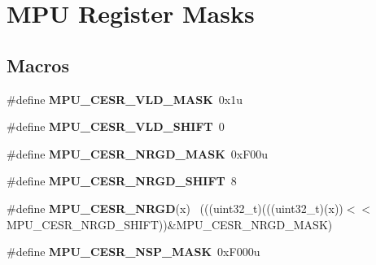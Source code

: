 \hypertarget{group___m_p_u___register___masks}{}\section{M\+P\+U Register Masks}
\label{group___m_p_u___register___masks}
\subsection*{Macros}
\begin{DoxyCompactItemize}
\item 
\hypertarget{group___m_p_u___register___masks_ga97170048bb44b005879eac9ef8db2c14}{}\#define {\bfseries M\+P\+U\+\_\+\+C\+E\+S\+R\+\_\+\+V\+L\+D\+\_\+\+M\+A\+S\+K}~0x1u\label{group___m_p_u___register___masks_ga97170048bb44b005879eac9ef8db2c14}

\item 
\hypertarget{group___m_p_u___register___masks_ga78bad194c9de3bebb9eba101cf58c613}{}\#define {\bfseries M\+P\+U\+\_\+\+C\+E\+S\+R\+\_\+\+V\+L\+D\+\_\+\+S\+H\+I\+F\+T}~0\label{group___m_p_u___register___masks_ga78bad194c9de3bebb9eba101cf58c613}

\item 
\hypertarget{group___m_p_u___register___masks_gab2bc6f6060eddc0403a79f7f5e31f270}{}\#define {\bfseries M\+P\+U\+\_\+\+C\+E\+S\+R\+\_\+\+N\+R\+G\+D\+\_\+\+M\+A\+S\+K}~0x\+F00u\label{group___m_p_u___register___masks_gab2bc6f6060eddc0403a79f7f5e31f270}

\item 
\hypertarget{group___m_p_u___register___masks_ga30493ea4dcacc6d2bf116459dd57362e}{}\#define {\bfseries M\+P\+U\+\_\+\+C\+E\+S\+R\+\_\+\+N\+R\+G\+D\+\_\+\+S\+H\+I\+F\+T}~8\label{group___m_p_u___register___masks_ga30493ea4dcacc6d2bf116459dd57362e}

\item 
\hypertarget{group___m_p_u___register___masks_ga7409b2905721fcdbd64058717f0f97af}{}\#define {\bfseries M\+P\+U\+\_\+\+C\+E\+S\+R\+\_\+\+N\+R\+G\+D}(x)                                              ~(((uint32\+\_\+t)(((uint32\+\_\+t)(x))$<$$<$M\+P\+U\+\_\+\+C\+E\+S\+R\+\_\+\+N\+R\+G\+D\+\_\+\+S\+H\+I\+F\+T))\&M\+P\+U\+\_\+\+C\+E\+S\+R\+\_\+\+N\+R\+G\+D\+\_\+\+M\+A\+S\+K)\label{group___m_p_u___register___masks_ga7409b2905721fcdbd64058717f0f97af}

\item 
\hypertarget{group___m_p_u___register___masks_gadfa15098e24cc47d3c919a4a50702050}{}\#define {\bfseries M\+P\+U\+\_\+\+C\+E\+S\+R\+\_\+\+N\+S\+P\+\_\+\+M\+A\+S\+K}~0x\+F000u\label{group___m_p_u___register___masks_gadfa15098e24cc47d3c919a4a50702050}


\end{DoxyCompactItemize}
